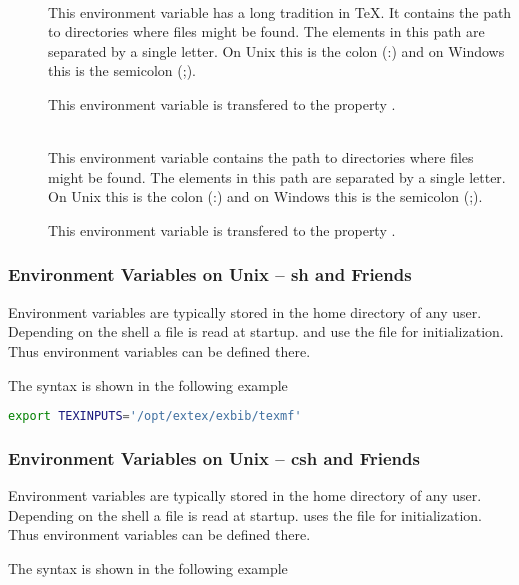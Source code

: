 \begin{description}
\item []\ \\
  This environment variable has a long tradition in \TeX. It contains
  the path to directories where files might be found. The elements in
  this path are separated by a single letter. On Unix this is the
  colon (:) and on Windows this is the semicolon (;).

  This environment variable is transfered to the property
  . 

\item []\ \\
  This environment variable contains the path to directories where
  files might be found. The elements in this path are separated by a
  single letter. On Unix this is the colon (:) and on Windows this is
  the semicolon (;).

  This environment variable is transfered to the property
  . 
\end{description}


\subsubsection{Environment Variables on Unix -- sh and Friends}%
\label{sec:env-sh}

Environment variables are typically stored in the home directory of
any user. Depending on the shell a file is read at startup. 
and  use the file  for initialization. Thus
environment variables can be defined there.

The syntax is shown in the following example 

\begin{lstlisting}[language=sh]
export TEXINPUTS='/opt/extex/exbib/texmf'
\end{lstlisting}

\subsubsection{Environment Variables on Unix -- csh and Friends}

Environment variables are typically stored in the home directory of
any user. Depending on the shell a file is read at startup. 
uses the file  for initialization. Thus environment
variables can be defined there.

The syntax is shown in the following example 

